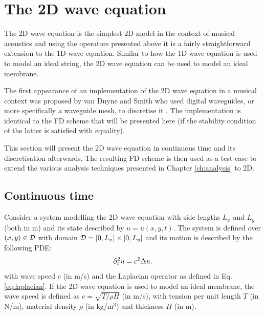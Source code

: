 \section{The 2D wave equation}\label{sec:2Dwave}
The 2D wave equation is the simplest 2D model in the context of musical acoustics and using the operators presented above it is a fairly straightforward extension to the 1D wave equation. Similar to how the 1D wave equation is used to model an ideal string, the 2D wave equation can be used to model an ideal membrane. 

The first appearance of an implementation of the 2D wave equation in a musical context was proposed by van Duyne and Smith who used digital waveguides, or more specifically a waveguide mesh, to discretise it \cite{Duyne1993}. The implementation is identical to the FD scheme that will be presented here (if the stability condition of the latter is satisfied with equality).

This section will present the 2D wave equation in continuous time and its discretisation afterwards. The resulting FD scheme is then used as a test-case to extend the various analysis techniques presented in Chapter \ref{ch:analysis} to 2D.

\subsection{Continuous time}
Consider a system modelling the 2D wave equation with side lengths $L_x$ and $L_y$ (both in m) and its state described by $u = u(x,y,t)$. The system is defined over $(x,y) \in \mathcal{D}$ with domain $\mathcal{D} = [0, L_x] \times[0, L_y]$ and its motion is described by the following PDE:
\begin{equation}\label{eq:2DwavePDE}
    \partial_t^2 u = c^2\Delta u,
\end{equation}
with wave speed $c$ (in m/s) and the Laplacian operator as defined in Eq. \eqref{eq:laplacian}. If the 2D wave equation is used to model an ideal membrane, the wave speed is defined as $c = \sqrt{T/\rho H}$ (in m/s), with tension per unit length $T$ (in N/m), material density $\rho$ (in kg/m$^3$) and thickness $H$ (in m).

